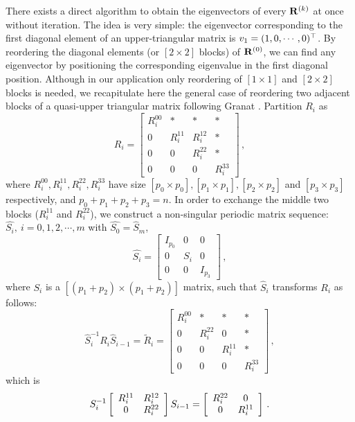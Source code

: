 \documentclass[final,leqno,onefignum,onetabnum]{siamltexmm}
\begin{document}
There exists a direct algorithm to obtain the eigenvectors of every
$\mathbf{R}^{(k)}$ at once without iteration. The idea is very simple: the
eigenvector corresponding to the first diagonal element of an
upper-triangular matrix is $v_{1}=(1,0,\cdots,0)^\top $. By
reordering the diagonal elements (or $[2\!\times\! 2]$ blocks) of
$\mathbf{R}^{(0)}$, we can find any eigenvector by positioning the corresponding
eigenvalue in the first diagonal position. Although in our application
only reordering of $[1\!\times\! 1]$ and $[2\!\times\! 2]$ blocks is
needed, we recapitulate here the general case of reordering two adjacent
blocks of a quasi-upper triangular matrix following
Granat {\etal}.
Partition $R_{i}$ as
\[
R_{i}=
\left[
\begin{array}{c|cc|c}
  R^{00}_{i} & * & *& * \\ \hline
  0 & R^{11}_{i} & R^{12}_{i} & * \\
  0 & 0 & R^{22}_{i} & * \\ \hline
  0 & 0 & 0 & R^{33}_{i}
\end{array}
\right]
\,,
\]
where $R^{00}_{i}, R^{11}_{i},R^{22}_{i},R^{33}_{i}$ have size
$[p_{0}\!\times\! p_{0}], [p_{1}\!\times\! p_{1}], [p_{2}\!\times\!
p_{2}]$ and $[p_{3}\!\times\! p_{3}]$ respectively, and
$p_{0}+p_{1}+p_{2}+p_{3}=n$. In order to exchange the middle two blocks
($R^{11}_{i}$ and $R^{22}_{i}$), we construct a non-singular periodic
matrix sequence: $\hat{S_{i}},\:i=0,1,2,\cdots,m$ with
$\hat{S_{0}}=\hat{S}_{m}$,
\[
\hat{S_{i}}=
\left[
\begin{array}{c|c|c}
  I_{p_{0}} & 0 & 0  \\ \hline
  0 & S_{i} & 0 \\ \hline
  0 & 0 & I_{p_{3}}
\end{array}
\right]
\,,
\]
where $S_{i}$ is a $[(p_{1}+p_{2})\!\times\! (p_{1}+p_{2})]$ matrix,
such that $\hat{S}_{i}$ transforms $R_{i}$ as follows:
\begin{equation}
\label{eq:xdtransform}
\hat{S}_{i}^{-1}R_{i}\hat{S}_{i-1}=\tilde{R}_{i}=
\left[
\begin{array}{c|cc|c}
  R^{00}_{i} & * & *& * \\ \hline
  0 & R^{22}_{i} & 0 & * \\
  0 & 0 & R^{11}_{i} & * \\ \hline
  0 & 0 & 0 & R^{33}_{i}
\end{array}
\right]
\,,
\end{equation}
which is
\[
S^{-1}_{i}
\left[
\begin{array}{c c}
  R^{11}_{i} & R^{12}_{i} \\
  0 & R^{22}_{i}
\end{array}
\right]
S_{i-1}=
\left[
\begin{array}{c c}
  R^{22}_{i} & 0 \\
  0 & R^{11}_{i}
\end{array}
\right]
\,.
\]
\end{document}
